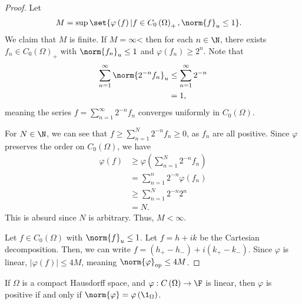 \documentclass[10pt]{mypackage}
\begin{document}
\begin{proof}
  Let
  \begin{align*}
    M &= \sup\set{\varphi\left(f\right)| f\in C_0\left(\Omega\right)_{+},\norm{f}_{u}\leq 1}.
  \end{align*}
  We claim that $M$ is finite. If $M = \infty$< then for each $n\in \N$, there exists $f_n\in C_0\left(\Omega\right)_{+}$ with $\norm{f_n}_{u}\leq 1$ and $\varphi\left(f_n\right) \geq 2^n$. Note that
  \begin{align*}
    \sum_{n=1}^{\infty}\norm{2^{-n}f_n}_{u} &\leq \sum_{n=1}^{\infty}2^{-n}\\
                                            &= 1,
  \end{align*}
  meaning the series $f = \sum_{n=1}^{\infty}2^{-n}f_n$ converges uniformly in $C_0\left(\Omega\right)$.\newline

  For $N\in \N$, we can see that $f\geq \sum_{n=1}^{N}2^{-n}f_n \geq 0$, as $f_n$ are all positive. Since $\varphi$ preserves the order on $C_0\left(\Omega\right)$, we have
  \begin{align*}
    \varphi(f) &\geq \varphi\left(\sum_{n=1}^{N}2^{-n}f_n\right)\\
               &= \sum_{n=1}^{n}2^{-n}\varphi\left(f_n\right)\\
               &\geq \sum_{n=1}^{N}2^{-n}2^{n}\\
               &= N.
  \end{align*}
  This is absurd since $N$ is arbitrary. Thus, $M < \infty$.\newline

  Let $f\in C_0\left(\Omega\right)$ with $\norm{f}_u \leq 1$. Let $f = h + ik$ be the Cartesian decomposition. Then, we can write $f = \left(h_{+} - h_{-}\right) + i\left(k_{+} - k_{-}\right)$. Since $\varphi$ is linear, $\left\vert \varphi(f) \right\vert \leq 4M$, meaning $\norm{\varphi}_{\text{op}} \leq 4M$.
\end{proof}
\begin{proposition}
  If $\Omega$ is a compact Hausdorff space, and $\varphi: C\left(\Omega\right)\rightarrow \F$ is linear, then $\varphi$ is positive if and only if $\norm{\varphi} = \varphi\left(\1_{\Omega}\right)$.
\end{proposition}
\end{document}

